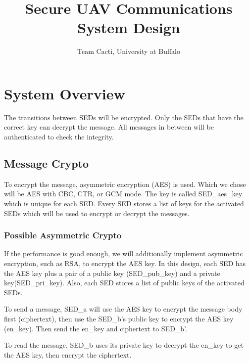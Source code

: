 \documentclass[11pt,oneside,onecolumn,letterpaper]{article}
\title{Secure UAV Communications System Design}
\author{Team Cacti, University at Buffalo}
\date{}
\begin{document}
\normalsize


\maketitle

\renewcommand{\thepage}{System Design, Cacti, UB--\arabic{page}}
\setcounter{page}{1} \normalsize
%

\newcommand{\flagRollback}{\textsf{Rollback}\xspace}

\section{System Overview}

The transitions between SEDs will be encrypted.
Only the SEDs that have the correct key can decrypt the message.
All messages in between will be authenticated to check the integrity.

\subsection{Message Crypto}
To encrypt the message, asymmetric encryption (AES) is used.
Which we chose will be AES with CBC, CTR, or GCM mode.
The key is called SED\_aes\_key which is unique for each SED.
Every SED stores a list of keys for the activated SEDs which will be used to encrypt or decrypt the messages.

\subsubsection{Possible Asymmetric Crypto}
If the performance is good enough, we will additionally implement asymmetric encryption, such as RSA, to encrypt the AES key.
In this design, each SED has the AES key plus a pair of a public key (SED\_pub\_key) and a private key(SED\_pri\_key).
Also, each SED stores a list of public keys of the activated SEDs.

To send a message, SED\_a will use the AES key to encrypt the message body first (ciphertext), then use the SED\_b's public key to encrypt the AES key (en\_key).
Then send the en\_key and ciphertext to SED\_b'.

To read the message, SED\_b uses its private key to decrypt the en\_key to get the AES key, then encrypt the ciphertext. 
\end{document}
